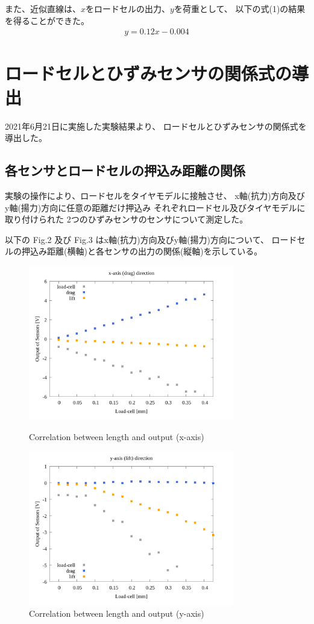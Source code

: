\documentclass[twocolumn,a4j]{jsarticle}
\begin{document}
また、近似直線は、$x$をロードセルの出力、$y$を荷重として、
以下の式(1)の結果を得ることができた。
\begin{eqnarray}
    y = 0.12 x - 0.004
\end{eqnarray}

\newpage

\section{ロードセルとひずみセンサの関係式の導出}
2021年6月21日に実施した実験結果より、
ロードセルとひずみセンサの関係式を導出した。\\

\subsection{各センサとロードセルの押込み距離の関係}
実験の操作により、ロードセルをタイヤモデルに接触させ、
x軸(抗力)方向及びy軸(揚力)方向に任意の距離だけ押込み
それぞれロードセル及びタイヤモデルに取り付けられた
2つのひずみセンサのセンサについて測定した。\par
以下の Fig.2 及び Fig.3 はx軸(抗力)方向及びy軸(揚力)方向について、
ロードセルの押込み距離(横軸)と各センサの出力の関係(縦軸)を示している。
\begin{figure}[htbp]
    \footnotesize
    \begin{center}
        \includegraphics[width=90mm]{images/03_length-output_x.png}
        \caption{Correlation between length and output (x-axis)}
        \includegraphics[width=90mm]{images/04_length-output_y.png}
        \caption{Correlation between length and output (y-axis)}
    \end{center}
\end{figure}
\end{document}
